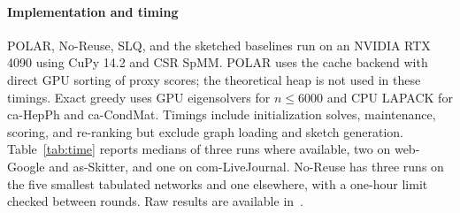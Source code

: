 \documentclass[conference]{IEEEtran}
\theoremstyle{definition}
\newcommand{\POLAR}{\textsc{POLAR}}
\begin{document}
\paragraph{Implementation and timing}
\POLAR{}, No-Reuse, SLQ, and the sketched baselines run on an NVIDIA
RTX 4090 using CuPy 14.2 and CSR SpMM. \POLAR{} uses the cache backend
with direct GPU sorting of proxy scores; the theoretical heap is not
used in these timings. Exact greedy uses GPU eigensolvers for
$n\le6000$ and CPU LAPACK for ca-HepPh and ca-CondMat. Timings include
initialization solves, maintenance, scoring, and re-ranking but exclude
graph loading and sketch generation. Table~\ref{tab:time} reports
medians of three runs where available, two on web-Google and as-Skitter,
and one on com-LiveJournal. No-Reuse has three runs on the five smallest
tabulated networks and one elsewhere, with a one-hour limit checked
between rounds. Raw results are available in~\cite{polar-repo}.
\end{document}
